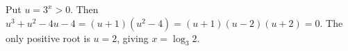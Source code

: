 Put $u=3^x>0$. Then $u^3+u^2-4u-4=(u+1)(u^2-4)=(u+1)(u-2)(u+2)=0$. The only positive root is $u=2$, giving $\boxed{x=\log_3 2}$.
